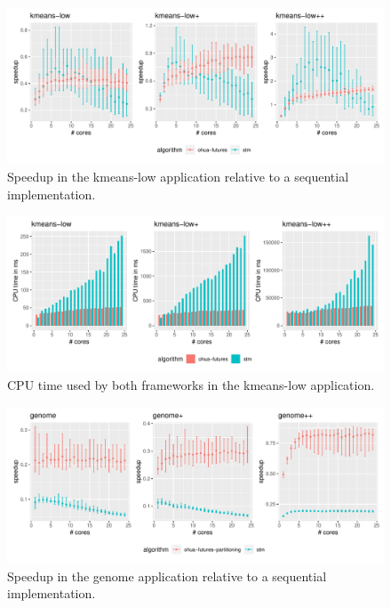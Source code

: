 \begin{figure}
    \centering
    \includegraphics[width=\textwidth,keepaspectratio]{gfx/results/kmeans-low_comb}
    \caption{Speedup in the kmeans-low application relative to a sequential implementation.}%
    \label{fig:evaluation:kmeans-low}
\end{figure}

\begin{figure}
    \centering
    \includegraphics[width=\textwidth,keepaspectratio]{gfx/results/cpu_kmeans-low_comb}
    \caption{CPU time used by both frameworks in the kmeans-low application.}%
    \label{fig:evaluation:kmeans-low-cpu}
\end{figure}

\begin{figure}
    \centering
    \includegraphics[width=\textwidth,keepaspectratio]{gfx/results/genome_comb}
    \caption{Speedup in the genome application relative to a sequential implementation.}%
    \label{fig:evaluation:genome}
\end{figure}

